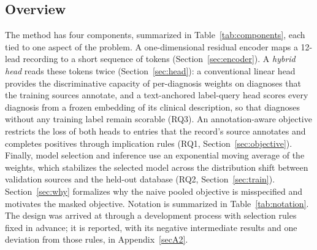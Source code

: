 \subsection{Overview}\label{sec:overview}
The method has four components, summarized in Table~\ref{tab:components}, each tied to one aspect of the problem. A one-dimensional residual encoder maps a 12-lead recording to a short sequence of tokens (Section~\ref{sec:encoder}). A \emph{hybrid head} reads these tokens twice (Section~\ref{sec:head}): a conventional linear head provides the discriminative capacity of per-diagnosis weights on diagnoses that the training sources annotate, and a text-anchored label-query head scores every diagnosis from a frozen embedding of its clinical description, so that diagnoses without any training label remain scorable (RQ3). An annotation-aware objective restricts the loss of both heads to entries that the record's source annotates and completes positives through implication rules (RQ1, Section~\ref{sec:objective}). Finally, model selection and inference use an exponential moving average of the weights, which stabilizes the selected model across the distribution shift between validation sources and the held-out database (RQ2, Section~\ref{sec:train}). Section~\ref{sec:why} formalizes why the naive pooled objective is misspecified and motivates the masked objective. Notation is summarized in Table~\ref{tab:notation}. The design was arrived at through a development process with selection rules fixed in advance; it is reported, with its negative intermediate results and one deviation from those rules, in Appendix~\ref{secA2}.

